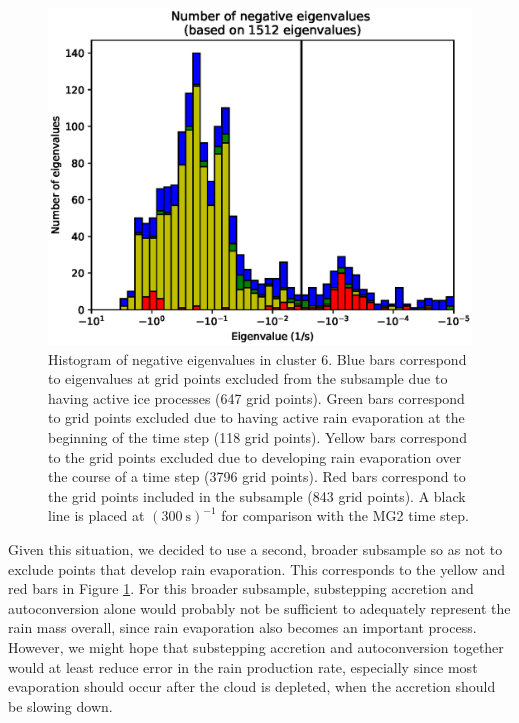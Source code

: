 \documentclass [11pt, proquest] {uwthesis}[2020/02/24]
\begin{document}
\begin{figure}[htbp]
  \includegraphics[width=6.5in]{./time_hist_all_values_neg_c6_subsample.eps}
  \caption[Histogram of negative eigenvalues of the Jacobian of MG2, focusing on a cluster of rain-producing grid cells]{Histogram of negative eigenvalues in cluster 6. Blue bars correspond to eigenvalues at grid points excluded from the subsample due to having active ice processes (\num{647} grid points). Green bars correspond to grid points excluded due to having active rain evaporation at the beginning of the time step (\num{118} grid points). Yellow bars correspond to the grid points excluded due to developing rain evaporation over the course of a time step (\num{3796} grid points). Red bars correspond to the grid points included in the subsample (\num{843} grid points). A black line is placed at $(\SI{300}{\second})^{-1}$ for comparison with the MG2 time step.}
  \label{eig-c6-subsample}
\end{figure}

Given this situation, we decided to use a second, broader subsample so as not to exclude points that develop rain evaporation. This corresponds to the yellow and red bars in Figure \ref{eig-c6-subsample}. For this broader subsample, substepping accretion and autoconversion alone would probably not be sufficient to adequately represent the rain mass overall, since rain evaporation also becomes an important process. However, we might hope that substepping accretion and autoconversion together would at least reduce error in the rain production rate, especially since most evaporation should occur after the cloud is depleted, when the accretion should be slowing down.
\end{document}
